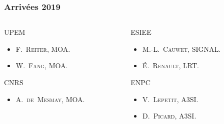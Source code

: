 \documentclass[]{beamer}
\begin{document}

\begin{frame}
  \frametitle{Arrivées 2019}

  \begin{columns}
    \begin{column}{0.5\textwidth}
      \begin{block}{UPEM}
        \begin{itemize}
          \item \textsc{F.~Reiter}, MOA.
          \item \textsc{W.~Fang}, MOA.
        \end{itemize}
      \end{block}

      \bigskip

      \begin{block}{CNRS}
        \begin{itemize}
          \item \textsc{A.~de~Mesmay}, MOA.
        \end{itemize}
      \end{block}
    \end{column}
    \begin{column}{0.5\textwidth}
      \begin{block}{ESIEE}
        \begin{itemize}
          \item \textsc{M.-L.~Cauwet}, SIGNAL.
          \item \textsc{\'E.~Renault}, LRT.
        \end{itemize}
      \end{block}

      \bigskip

      \begin{block}{ENPC}
        \begin{itemize}
          \item \textsc{V.~Lepetit}, A3SI.
          \item \textsc{D.~Picard}, A3SI.
        \end{itemize}
      \end{block}
    \end{column}
  \end{columns}
\end{frame}

\end{document}
